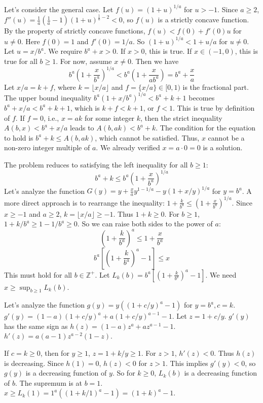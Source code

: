 \documentclass[12pt,a4paper]{article}
\theoremstyle{definition}
\begin{document}
        Let's consider the general case. Let $f(u) = (1+u)^{1/a}$ for $u>-1$. Since $a \geq 2$, $f''(u) = \frac{1}{a}\left(\frac{1}{a}-1\right)(1+u)^{\frac{1}{a}-2} < 0$, so $f(u)$ is a strictly concave function.
        By the property of strictly concave functions, $f(u) < f(0)+f'(0)u$ for $u \neq 0$.
        Here $f(0)=1$ and $f'(0)=1/a$. So $(1+u)^{1/a} < 1+u/a$ for $u \neq 0$.
        Let $u = x/b^a$. We require $b^a+x>0$. If $x>0$, this is true. If $x \in (-1,0)$, this is true for all $b \geq 1$. For now, assume $x \neq 0$.
        Then we have
        \[ b^a \left(1 + \frac{x}{b^a}\right)^{1/a} < b^a \left(1 + \frac{x}{ab^a}\right) = b^a + \frac{x}{a} \]
        Let $x/a = k+f$, where $k=\lfloor x/a \rfloor$ and $f=\{x/a\} \in [0,1)$ is the fractional part.
        The upper bound inequality $b^a(1+x/b^a)^{1/a} < b^a+k+1$ becomes $b^a+x/a < b^a+k+1$, which is $k+f < k+1$, or $f<1$. This is true by definition of $f$.
        If $f=0$, i.e., $x=ak$ for some integer $k$, then the strict inequality $A(b,x) < b^a+x/a$ leads to $A(b,ak) < b^a+k$. The condition for the equation to hold is $b^a+k \leq A(b,ak)$, which cannot be satisfied. Thus, $x$ cannot be a non-zero integer multiple of $a$. We already verified $x=a \cdot 0=0$ is a solution.

        The problem reduces to satisfying the left inequality for all $b \geq 1$:
        \[ b^a+k \leq b^a \left(1 + \frac{x}{b^a}\right)^{1/a} \]
        Let's analyze the function $G(y) = y + \frac{x}{a} y^{1-1/a} - y(1+x/y)^{1/a}$ for $y=b^a$.
        A more direct approach is to rearrange the inequality:
        $1 + \frac{k}{b^a} \leq \left(1+\frac{x}{b^a}\right)^{1/a}$.
        Since $x \geq -1$ and $a \geq 2$, $k=\lfloor x/a \rfloor \geq -1$. Thus $1+k \geq 0$. For $b \geq 1$, $1+k/b^a \geq 1-1/b^a \geq 0$. So we can raise both sides to the power of $a$:
        \[ \left(1 + \frac{k}{b^a}\right)^a \leq 1 + \frac{x}{b^a} \]
        \[ b^a\left[\left(1 + \frac{k}{b^a}\right)^a - 1\right] \leq x \]
        This must hold for all $b \in \mathbb{Z}^+$. Let $L_k(b) = b^a\left[\left(1 + \frac{k}{b^a}\right)^a - 1\right]$. We need $x \geq \sup_{b\geq 1} L_k(b)$.

        Let's analyze the function $g(y) = y((1+c/y)^a-1)$ for $y=b^a, c=k$.
        $g'(y) = (1-a)(1+c/y)^a+a(1+c/y)^{a-1}-1$.
        Let $z = 1+c/y$. $g'(y)$ has the same sign as $h(z)=(1-a)z^a+az^{a-1}-1$.
        $h'(z) = a(a-1)z^{a-2}(1-z)$.

        If $c=k \geq 0$, then for $y \geq 1$, $z=1+k/y \geq 1$. For $z>1$, $h'(z)<0$. Thus $h(z)$ is decreasing. Since $h(1)=0$, $h(z)<0$ for $z>1$. This implies $g'(y)<0$, so $g(y)$ is a decreasing function of $y$.
        So for $k \geq 0$, $L_k(b)$ is a decreasing function of $b$. The supremum is at $b=1$.
        $x \geq L_k(1) = 1^a((1+k/1)^a-1) = (1+k)^a-1$.
\end{document}
